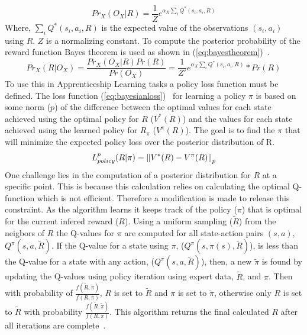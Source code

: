 \documentclass[12pt,american]{report}
\begin{document}
\begin{equation}
            \label{eq:bayseianliklihood}
            Pr_X(O_X|R) =  \frac{1}{Z}e^{\alpha_X\sum_{i}^{}Q^*(s_i,a_i,R)}%
        \end{equation}
Where, $\sum_{i}^{}Q^*(s_i,a_i,R)$ is the expected value of the observations $(s_i,a_i)$ using $R$. $Z$ is a normalizing constant. To compute the posterior probability of the reward function Bayes theorem is used as shown in (\ref{eq:bayestheorem})~\cite{ramachandran2007bayesian}.
\begin{equation}
            \label{eq:bayestheorem}
            Pr_X(R|O_X) =  \frac{Pr_X(O_X|R)Pr(R)}{Pr(O_X)}= \frac{1}{Z'}e^{\alpha_X\sum_{i}^{}Q^*(s_i,a_i,R)}*Pr(R)%
        \end{equation}
To use this in Apprenticeship Learning tasks a policy loss function must be defined. The loss function (\ref{eq:bayesianloss})~\cite{ramachandran2007bayesian} for learning a policy $\pi$ is based on some norm ($p$) of the difference between the optimal values for each state achieved using the optimal policy for $R$ ($V^*(R)$) and the values for each state achieved using the learned policy for $R_{\pi}$ ($V^\pi(R)$).  The goal is to find the $\pi$ that will minimize the expected policy loss over the posterior distribution of R.  
\begin{equation}
            \label{eq:bayesianloss}
            L_{policy}^{p}(R|\pi)=\norm{V^*(R)-V^\pi(R)}_p%
        \end{equation}
One challenge lies in the computation of a posterior distribution for $R$ at a specific point.  This is because this calculation relies on calculating the optimal Q-function which is not efficient.  Therefore a modification is made to release this constraint.  As the algorithm learns it keeps track of the policy ($\pi$) that is optimal for the current infered reward ($R$).  Using a uniform sampling ($\tilde{R}$) from the neigbors of $R$ the Q-values for $\pi$ are computed for all state-action pairs $(s,a)$, $Q^\pi(s,a,\tilde{R})$. If the Q-value for a state using $\pi$, ($Q^\pi(s,\pi(s),\tilde{R})$), is less than the Q-value for a state with any action, ($Q^\pi(s,a,\tilde{R})$), then, a new $\tilde{\pi}$ is found by updating the Q-values using policy iteration using expert data, $\tilde{R}$, and $\pi$. Then with probability of $\frac{f(\tilde{R},\tilde{\pi})}{f(R,\pi)}$, $R$ is set to $\tilde{R}$ and $\pi$ is set to $\tilde{\pi}$, otherwise only $R$ is set to $\tilde{R}$  with probability $\frac{f(\tilde{R},\tilde{\pi})}{f(R,\pi)}$.  This algorithm returns the final calculated $R$ after all iterations are complete~\cite{ramachandran2007bayesian}.
\end{document}
